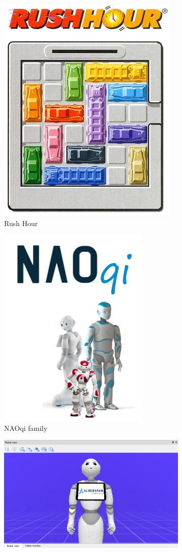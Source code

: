 \documentclass{article}
\begin{document}
\begin{figure}[H]
    \centering
    \begin{subfigure}{.33\textwidth}
      \centering
      \includegraphics[width=0.5\linewidth]{images/rushhour.jpg}
      \caption{Rush Hour}
      \label{fig:rush_hour}
    \end{subfigure}%
    \begin{subfigure}{.33\textwidth}
      \centering
      \includegraphics[width=0.6\linewidth]{images/naoqi_fam1.png}
      \caption{NAOqi family}
      \label{fig:naoqi_family}
    \end{subfigure}
    \begin{subfigure}{.33\textwidth}
      \centering
      \includegraphics[width=0.85\linewidth]{images/pepper_choregraphe.png}

\end{subfigure}
\end{figure}
\end{document}
